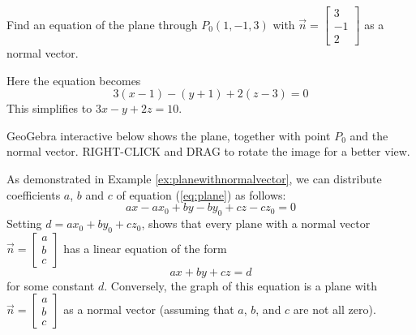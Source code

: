 \documentclass{ximera}
\begin{document}
\begin{example}\label{ex:planewithnormalvector}
Find an equation of the plane through $P_{0}(1, -1, 3)$ with $\vec{n} = 
\begin{bmatrix}
3\\
-1\\
2
\end{bmatrix}$
 as a normal vector.
\begin{explanation}
  Here the equation becomes
\begin{equation*}
3(x - 1) - (y + 1) + 2(z - 3) = 0
\end{equation*}
This simplifies to $3x - y + 2z = 10$.

GeoGebra interactive below shows the plane, together with point $P_0$ and the normal vector.  RIGHT-CLICK and DRAG to rotate the image for a better view.


\begin{onlineOnly}
\begin{center} 
\end{center}
\end{onlineOnly}

\end{explanation}
\end{example}

As demonstrated in Example \ref{ex:planewithnormalvector}, we can distribute coefficients $a$, $b$ and $c$  of equation (\ref{eq:plane}) as follows:
$$ax-ax_0+by-by_0+cz-cz_0=0$$
Setting $d = ax_{0} + by_{0} + cz_{0}$, shows that every plane with a normal vector $\vec{n} =
\begin{bmatrix}
a\\
b\\
c
\end{bmatrix}$
 has a linear equation of the form
\begin{equation} \label{eq:eqofline} 
ax + by + cz = d
\end{equation}
for some constant $d$. Conversely, the graph of this equation is a plane with $\vec{n} =
\begin{bmatrix}
a\\
b\\
c
\end{bmatrix}$ as a normal vector (assuming that $a$, $b$, and $c$ are not all zero).
\end{document}
